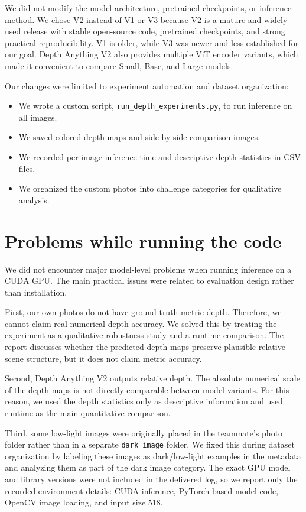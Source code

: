 \documentclass[10pt,a4paper]{article}
\begin{document}
We did not modify the model architecture, pretrained checkpoints, or inference method. We chose V2 instead of V1 or V3 because V2 is a mature and widely used release with stable open-source code, pretrained checkpoints, and strong practical reproducibility. V1 is older, while V3 was newer and less established for our goal. Depth Anything V2 also provides multiple ViT encoder variants, which made it convenient to compare Small, Base, and Large models.

Our changes were limited to experiment automation and dataset organization:

\begin{itemize}
    \item We wrote a custom script, \texttt{run\_depth\_experiments.py}, to run inference on all images.
    \item We saved colored depth maps and side-by-side comparison images.
    \item We recorded per-image inference time and descriptive depth statistics in CSV files.
    \item We organized the custom photos into challenge categories for qualitative analysis.
\end{itemize}

\section{Problems while running the code}

We did not encounter major model-level problems when running inference on a CUDA GPU. The main practical issues were related to evaluation design rather than installation.

First, our own photos do not have ground-truth metric depth. Therefore, we cannot claim real numerical depth accuracy. We solved this by treating the experiment as a qualitative robustness study and a runtime comparison. The report discusses whether the predicted depth maps preserve plausible relative scene structure, but it does not claim metric accuracy.

Second, Depth Anything V2 outputs relative depth. The absolute numerical scale of the depth maps is not directly comparable between model variants. For this reason, we used the depth statistics only as descriptive information and used runtime as the main quantitative comparison.

Third, some low-light images were originally placed in the teammate's photo folder rather than in a separate \texttt{dark\_image} folder. We fixed this during dataset organization by labeling these images as dark/low-light examples in the metadata and analyzing them as part of the dark image category. The exact GPU model and library versions were not included in the delivered log, so we report only the recorded environment details: CUDA inference, PyTorch-based model code, OpenCV image loading, and input size 518.
\end{document}
